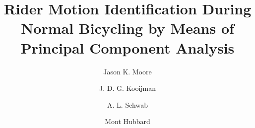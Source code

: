 %
%
%
%
%
%
\documentclass[smallextended]{svjour3}     %
%
\smartqed  %
%
\usepackage{graphicx}
%
\usepackage{mathptmx}      %
%
\usepackage{subfig}
%
%
%


\title{Rider Motion Identification During Normal Bicycling by Means of Principal Component Analysis%
}


\author{Jason K. Moore \and
        J. D. G. Kooijman \and
	A. L. Schwab \and
	Mont Hubbard %
}


